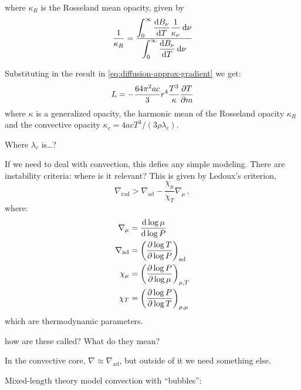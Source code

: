 \documentclass[main.tex]{subfiles}
\begin{document}
%
where \(\kappa_R\) is the Rosseland mean opacity, given by
%
\begin{equation}
  \frac{1}{\kappa_{R}} =
  \frac{ \displaystyle\int _{0}   ^{\infty}  \dv{B_\nu}{T} \frac{1}{\kappa_\nu} \dd{\nu}}
  {  \displaystyle \int _{0}   ^{\infty} \dv{B_\nu}{T} \dd{\nu}}
\end{equation}

Substituting in the result in \eqref{eq:diffusion-approx-gradient} we get:
%
\begin{equation}
    L = - \frac{64 \pi^2 a c }{3} r^4 \frac{T^3}{\kappa} \pdv{T}{m}
\end{equation}
%
where \(\kappa\) is a generalized opacity, the harmonic mean of the Rosseland opacity \(\kappa _R \) and the convective opacity \(\kappa_c = 4acT^3 / (3 \rho \lambda_c )\).

\begin{greenbox}
  Where \(\lambda_c\) is\dots  ?
\end{greenbox}

If we need to deal with convection, this defies any simple modeling. There are instability criteria: where is it relevant? This is given by
Ledoux's criterion,
%
\begin{equation}
    \nabla_{\text{rad}} > \nabla_{\text{ad}} - \frac{\chi_\mu}{\chi_T} \nabla_\mu\,,
\end{equation}
%
where:
%
\begin{subequations}
\begin{align}
  \nabla_\mu  &= \dv{\log \mu }{\log P} \\
  \nabla_{\text{ad}}  &= \qty(\pdv{\log T }{\log P} )_{\text{ad}} \\
  \chi_{\mu}  &= \qty(\pdv{\log P }{\log \mu} )_{\rho, T} \\
  \chi_{T}  &= \qty(\pdv{\log P }{\log T} )_{\rho, \mu}
\end{align}
\end{subequations}
%
which are thermodynamic parameters.

\begin{greenbox}
  how are these called? What do they mean?
\end{greenbox}

In the convective core, \(\nabla \approx \nabla_{\text{ad}}\), but outside of it we need something else.

Mixed-length theory model convection with ``bubbles'':
\end{document}
